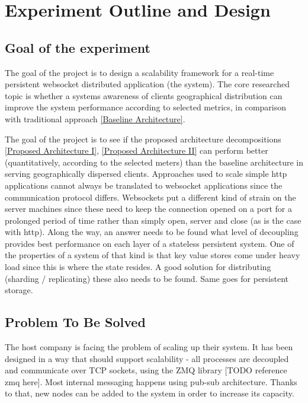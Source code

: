 \documentclass{uvamscse}
\begin{document}
\chapter{Experiment Outline and Design} \label{Experiment Outline and Design}

\section{Goal of the experiment}

The goal of the project is to design a scalability framework for a real-time persistent websocket distributed application (the system). The core researched topic is whether a systems awareness of clients geographical distribution can improve the system performance according to selected metrics, in comparison with traditional approach \ref{Baseline Architecture}.

The goal of the project is to see if the proposed architecture decompositions \ref{Proposed Architecture I}, \ref{Proposed Architecture II} can perform better (quantitatively, according to the selected meters) than the baseline architecture in serving geographically dispersed clients. Approaches used to scale simple http applications cannot always be translated to websocket applications since the communication protocol differs. Websockets put a different kind of strain on the server machines since these need to keep the connection opened on a port for a prolonged period of time rather than simply open, server and close (as is the case with http). Along the way, an answer needs to be found what level of decoupling provides best performance on each layer of a stateless persistent system. One of the properties of a system of that kind is that key value stores come under heavy load since this is where the state resides. A good solution for distributing (sharding / replicating) these also needs to be found. Same goes for persistent storage.

\section{Problem To Be Solved}
The host company is facing the problem of scaling up their system. It has been designed in a way that should support scalability - all processes are decoupled and communicate over TCP sockets, using the ZMQ library [TODO reference zmq here]. Most internal messaging happens using pub-sub architecture. Thanks to that, new nodes can be added to the system in order to increase its capacity.
\end{document}
